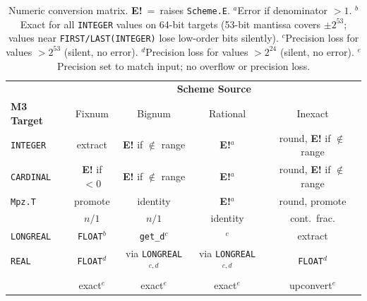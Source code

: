 \documentclass[12pt]{article}
\begin{document}
\begin{table}[htbp]
\centering
\small
\setlength{\tabcolsep}{4pt}
\begin{tabular}{l|cccc}
\toprule
 & \multicolumn{4}{c}{\textbf{Scheme Source}} \\
\textbf{M3 Target} &
  Fixnum &
  Bignum &
  \color{gray}Rational &
  Inexact \\
\midrule
{\tt INTEGER} &
  extract &
  \textbf{E!} if $\notin$ range &
  \color{gray}\textbf{E!}$^a$ &
  round, \textbf{E!} if $\notin$ range \\
{\tt CARDINAL} &
  \textbf{E!} if $< 0$ &
  \textbf{E!} if $\notin$ range &
  \color{gray}\textbf{E!}$^a$ &
  round, \textbf{E!} if $\notin$ range \\
{\tt Mpz.T} &
  promote &
  identity &
  \color{gray}\textbf{E!}$^a$ &
  round, promote \\
\color{gray}{\tt Mpq.T} &
  \color{gray}$n/1$ &
  \color{gray}$n/1$ &
  \color{gray}identity &
  \color{gray}cont.\ frac. \\
{\tt LONGREAL} &
  {\tt FLOAT}$^b$ &
  {\tt get\_d}$^c$ &
  \color{gray}{\tt get\_d}$^c$ &
  extract \\
{\tt REAL} &
  {\tt FLOAT}$^d$ &
  via {\tt LONGREAL}$^{c,d}$ &
  \color{gray}via {\tt LONGREAL}$^{c,d}$ &
  {\tt FLOAT}$^d$ \\
\color{gray}{\tt Mpfr.T} &
  \color{gray}exact$^e$ &
  \color{gray}exact$^e$ &
  \color{gray}exact$^e$ &
  \color{gray}upconvert$^e$ \\
\bottomrule
\end{tabular}
\caption{Numeric conversion matrix.
  \textbf{E!}~=~raises {\tt Scheme.E}.
  $^a$Error if denominator $> 1$.
  $^b$Exact for all {\tt INTEGER} values on 64-bit targets
  (53-bit mantissa covers $\pm 2^{53}$; values near
  {\tt FIRST/LAST(INTEGER)} lose low-order bits silently).
  $^c$Precision loss for values $> 2^{53}$ (silent, no error).
  $^d$Precision loss for values $> 2^{24}$ (silent, no error).
  $^e$Precision set to match input; no overflow or precision loss.}
\label{tab:numeric-detail}
\end{table}
\end{document}
